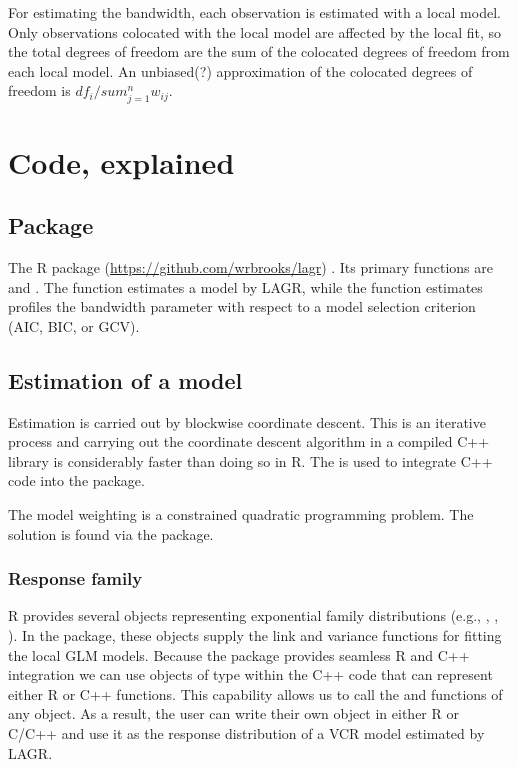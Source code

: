 For estimating the bandwidth, each observation is estimated with a local model. Only observations colocated with the local model are affected by the local fit, so the total degrees of freedom are the sum of the colocated degrees of freedom from each local model. An unbiased(?) approximation of the colocated degrees of freedom is $df_i / sum_{j=1}^n w_{ij}$.


\section{Code, explained}

\subsection{Package}
The R package  (\url{https://github.com/wrbrooks/lagr})  . Its primary functions are  and . The  function estimates a model by LAGR, while the  function estimates profiles the bandwidth parameter with respect to a model selection criterion (AIC, BIC, or GCV).

\subsection{Estimation of a model}
Estimation is carried out by blockwise coordinate descent. This is an iterative process and carrying out the coordinate descent algorithm in a compiled C++ library is considerably faster than doing so in R. The  is used to integrate C++ code into the  package.

The model weighting is a constrained quadratic programming problem. The solution is found via the  package.

\subsubsection{Response family}
R provides several  objects representing exponential family distributions (e.g., , , ). In the  package, these objects supply the link and variance functions for fitting the local GLM models. Because the  package provides seamless R and C++ integration we can use objects of type  within the C++ code that can represent either R or C++ functions. This capability allows us to call the  and  functions of any  object. As a result, the user can write their own  object in either R or C/C++ and use it as the response distribution of a VCR model estimated by LAGR.

